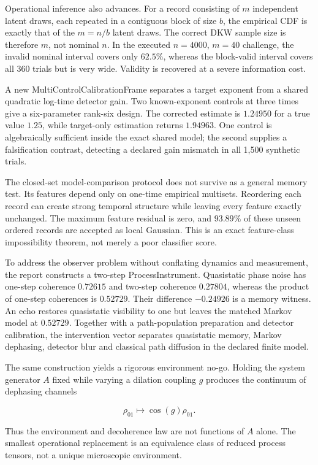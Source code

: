 \documentclass[11pt,a4paper,openany]{report}
\begin{document}
Operational inference also advances. For a record consisting of \(m\) independent latent draws, each repeated in a contiguous block of size \(b\), the empirical CDF is exactly that of the \(m=n/b\) latent draws. The correct DKW sample size is therefore \(m\), not nominal \(n\). In the executed \(n=4000\), \(m=40\) challenge, the invalid nominal interval covers only \(62.5\%\), whereas the block-valid interval covers all 360 trials but is very wide. Validity is recovered at a severe information cost.

A new MultiControlCalibrationFrame separates a target exponent from a shared quadratic log-time detector gain. Two known-exponent controls at three times give a six-parameter rank-six design. The corrected estimate is \(1.24950\) for a true value \(1.25\), while target-only estimation returns \(1.94963\). One control is algebraically sufficient inside the exact shared model; the second supplies a falsification contrast, detecting a declared gain mismatch in all 1,500 synthetic trials.

The closed-set model-comparison protocol does not survive as a general memory test. Its features depend only on one-time empirical multisets. Reordering each record can create strong temporal structure while leaving every feature exactly unchanged. The maximum feature residual is zero, and \(93.89\%\) of these unseen ordered records are accepted as local Gaussian. This is an exact feature-class impossibility theorem, not merely a poor classifier score.

To address the observer problem without conflating dynamics and measurement, the report constructs a two-step ProcessInstrument. Quasistatic phase noise has one-step coherence \(0.72615\) and two-step coherence \(0.27804\), whereas the product of one-step coherences is \(0.52729\). Their difference \(-0.24926\) is a memory witness. An echo restores quasistatic visibility to one but leaves the matched Markov model at \(0.52729\). Together with a path-population preparation and detector calibration, the intervention vector separates quasistatic memory, Markov dephasing, detector blur and classical path diffusion in the declared finite model.

The same construction yields a rigorous environment no-go. Holding the system generator \(A\) fixed while varying a dilation coupling \(g\) produces the continuum of dephasing channels

\[
\rho_{01}\longmapsto\cos(g)\rho_{01}.
\]

Thus the environment and decoherence law are not functions of \(A\) alone. The smallest operational replacement is an equivalence class of reduced process tensors, not a unique microscopic environment.
\end{document}
